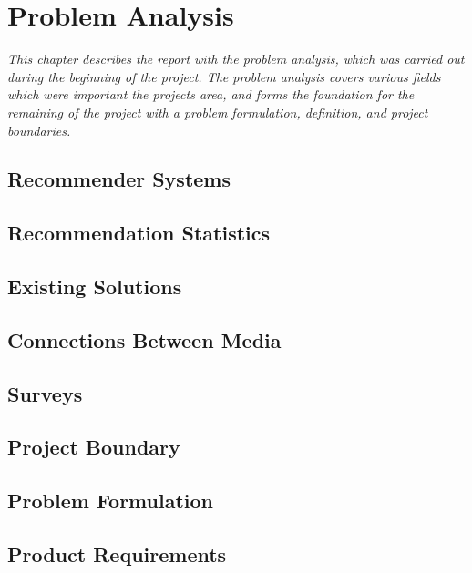 \chapter{Problem Analysis}

\textit{This chapter describes the report with the problem analysis, which was carried out during the beginning of the project. The problem analysis covers various fields which were important the projects area, and forms the foundation for the remaining of the project with a problem formulation, definition, and project boundaries.}

\section{Recommender Systems}
\label{RecommenderSystems}

\section{Recommendation Statistics}
\label{Statistics}

\section{Existing Solutions}
\label{Existing}

\section{Connections Between Media}
\label{Connections}

\section{Surveys}
\label{Surveys}

\section{Project Boundary}
\label{Boundary}

\section{Problem Formulation}
\label{Formulation}

\section{Product Requirements}
\label{Requirements}
